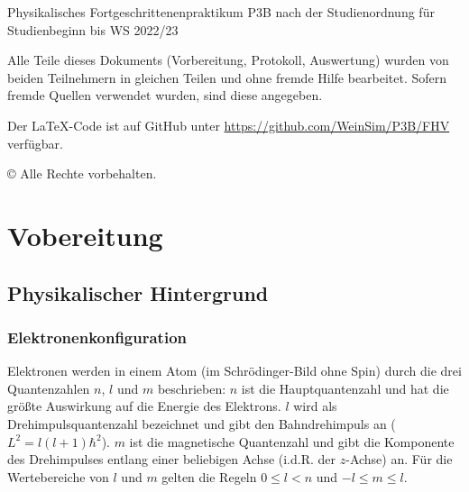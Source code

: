 \documentclass{article}
\title{\versuchsname}
\author{Simon Weinzierl, Yannic Werner}
\newcommand{\githuburl}{
    \url{https://github.com/WeinSim/P3B/FHV}
}
\begin{document}
\maketitle

\begin{center}
    Physikalisches Fortgeschrittenenpraktikum P3B
    nach der Studienordnung für Studienbeginn bis WS 2022/23
\end{center}

\vspace*{6cm}

\begin{center}
    \footnotesize
    Alle Teile dieses Dokuments (Vorbereitung, Protokoll, Auswertung) wurden
    von beiden Teilnehmern in gleichen Teilen und ohne fremde Hilfe bearbeitet.
    Sofern fremde Quellen verwendet wurden, sind diese angegeben.

    Der \LaTeX-Code ist auf GitHub unter \githuburl verfügbar.
    
    © Alle Rechte vorbehalten.
\end{center}


\newpage

\tableofcontents

\newpage




\newpage

\section{Vobereitung}

\subsection{Physikalischer Hintergrund}

\subsubsection{Elektronenkonfiguration}

Elektronen werden in einem Atom (im Schrödinger-Bild ohne Spin) durch die drei
Quantenzahlen $n$, $l$ und $m$ beschrieben:
$n$ ist die Hauptquantenzahl und hat die größte Auswirkung auf
die Energie des Elektrons. $l$ wird als Drehimpulsquantenzahl bezeichnet und
gibt den Bahndrehimpuls an ($L^2 = l (l + 1) \hbar^2$).
$m$ ist die magnetische Quantenzahl und gibt die Komponente des Drehimpulses
entlang einer beliebigen Achse (i.d.R. der $z$-Achse) an.
Für die Wertebereiche von $l$ und $m$ gelten die Regeln
$0 \leq l < n$ und $-l \leq m \leq l$.
\end{document}
